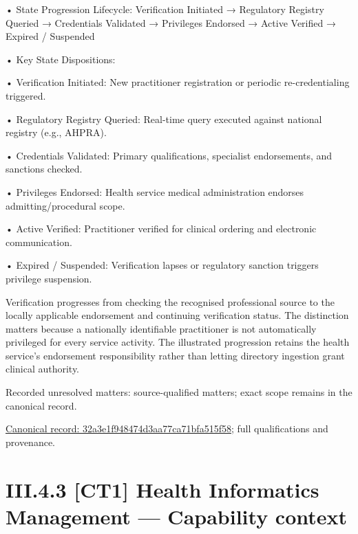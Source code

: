 •
State Progression Lifecycle: Verification Initiated → Regulatory Registry Queried → Credentials Validated → Privileges Endorsed → Active Verified → Expired / Suspended



•
Key State Dispositions:



•
Verification Initiated: New practitioner registration or periodic re-credentialing triggered.



•
Regulatory Registry Queried: Real-time query executed against national registry (e.g., AHPRA).



•
Credentials Validated: Primary qualifications, specialist endorsements, and sanctions checked.



•
Privileges Endorsed: Health service medical administration endorses admitting/procedural scope.



•
Active Verified: Practitioner verified for clinical ordering and electronic communication.



•
Expired / Suspended: Verification lapses or regulatory sanction triggers privilege suspension.



Verification progresses from checking the recognised professional source to the locally applicable endorsement and continuing verification status. The distinction matters because a nationally identifiable practitioner is not automatically privileged for every service activity. The illustrated progression retains the health service's endorsement responsibility rather than letting directory ingestion grant clinical authority.


{\small Recorded unresolved matters: source-qualified matters; exact scope remains in the canonical record.}\par
{\footnotesize \href{../../../../../../../continuum/business/business-process/32a3e1f948474d3aa77ca71bfa515f58.md}{Canonical record: 32a3e1f948474d3aa77ca71bfa515f58}; full qualifications and provenance.}\par
\section*{III.4.3 [CT1] Health Informatics Management — Capability context}
\label{navigation:III.4.3}

